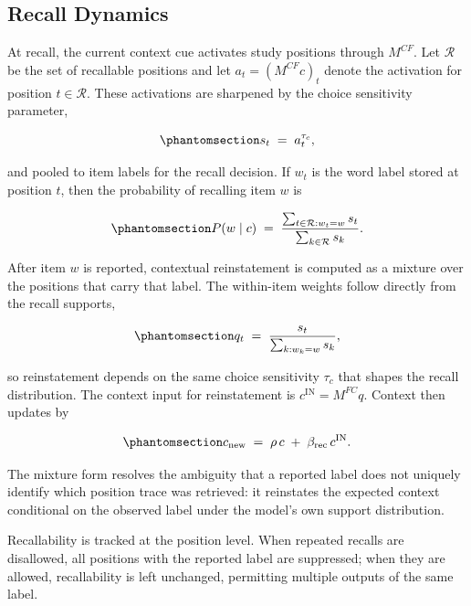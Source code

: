 \documentclass[
  man,
  floatsintext,
  longtable,
  nolmodern,
  notxfonts,
  notimes,
  draftfirst,
  colorlinks=true,linkcolor=blue,citecolor=blue,urlcolor=blue]{apa7}
\begin{document}
\subsection{Recall Dynamics}\label{recall-dynamics}

At recall, the current context cue activates study positions through
\(M^{CF}\). Let \(\mathcal{R}\) be the set of recallable positions and
let \(a_t = (M^{CF}c)_t\) denote the activation for position
\(t\in\mathcal{R}\). These activations are sharpened by the choice
sensitivity parameter,

\begin{equation}\phantomsection\label{eq-7}{
s_t \;=\; a_t^{\tau_c},
}\end{equation}

and pooled to item labels for the recall decision. If \(w_t\) is the
word label stored at position \(t\), then the probability of recalling
item \(w\) is

\begin{equation}\phantomsection\label{eq-8}{
P(w \mid c) \;=\; \frac{\sum_{t\in\mathcal{R}: w_t=w} s_t}{\sum_{k\in\mathcal{R}} s_k}.
}\end{equation}

After item \(w\) is reported, contextual reinstatement is computed as a
mixture over the positions that carry that label. The within-item
weights follow directly from the recall supports,

\begin{equation}\phantomsection\label{eq-9}{
q_t \;=\; \frac{s_t}{\sum_{k: w_k=w} s_k},
}\end{equation}

so reinstatement depends on the same choice sensitivity \(\tau_c\) that
shapes the recall distribution. The context input for reinstatement is
\(c^{\text{IN}} = M^{FC}q\). Context then updates by

\begin{equation}\phantomsection\label{eq-10}{
c_{\text{new}} \;=\; \rho\,c \;+\; \beta_{\text{rec}}\,c^{\text{IN}}.
}\end{equation}

The mixture form resolves the ambiguity that a reported label does not
uniquely identify which position trace was retrieved: it reinstates the
expected context conditional on the observed label under the model's own
support distribution.

Recallability is tracked at the position level. When repeated recalls
are disallowed, all positions with the reported label are suppressed;
when they are allowed, recallability is left unchanged, permitting
multiple outputs of the same label.
\end{document}
